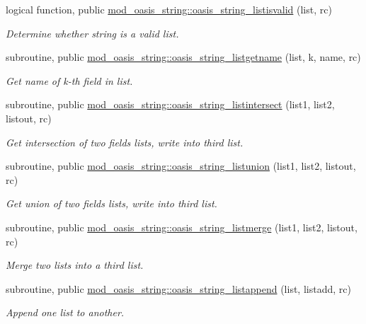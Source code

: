 \begin{DoxyCompactItemize}
logical function, public \hyperlink{namespacemod__oasis__string_ae8c50e9742e1f24cc0d7bfa9d476cd95}{mod\+\_\+oasis\+\_\+string\+::oasis\+\_\+string\+\_\+listisvalid} (list, rc)
\begin{DoxyCompactList}\small\item\em Determine whether string is a valid list. \end{DoxyCompactList}\item 
subroutine, public \hyperlink{namespacemod__oasis__string_a4d3a28944ce786f4d8d8a9555c63f8cd}{mod\+\_\+oasis\+\_\+string\+::oasis\+\_\+string\+\_\+listgetname} (list, k, name, rc)
\begin{DoxyCompactList}\small\item\em Get name of k-\/th field in list. \end{DoxyCompactList}\item 
subroutine, public \hyperlink{namespacemod__oasis__string_a8b9648bf4eb3a2373f1fac49e572436f}{mod\+\_\+oasis\+\_\+string\+::oasis\+\_\+string\+\_\+listintersect} (list1, list2, listout, rc)
\begin{DoxyCompactList}\small\item\em Get intersection of two fields lists, write into third list. \end{DoxyCompactList}\item 
subroutine, public \hyperlink{namespacemod__oasis__string_a3482d80f258c8062e8dd0d4eff8135b7}{mod\+\_\+oasis\+\_\+string\+::oasis\+\_\+string\+\_\+listunion} (list1, list2, listout, rc)
\begin{DoxyCompactList}\small\item\em Get union of two fields lists, write into third list. \end{DoxyCompactList}\item 
subroutine, public \hyperlink{namespacemod__oasis__string_adb1544a078e3abd743749f857fca5aee}{mod\+\_\+oasis\+\_\+string\+::oasis\+\_\+string\+\_\+listmerge} (list1, list2, listout, rc)
\begin{DoxyCompactList}\small\item\em Merge two lists into a third list. \end{DoxyCompactList}\item 
subroutine, public \hyperlink{namespacemod__oasis__string_a47bd1c6d7ee6ea7dcec169fa140481aa}{mod\+\_\+oasis\+\_\+string\+::oasis\+\_\+string\+\_\+listappend} (list, listadd, rc)
\begin{DoxyCompactList}\small\item\em Append one list to another. \end{DoxyCompactList}\item 

\end{DoxyCompactItemize}
